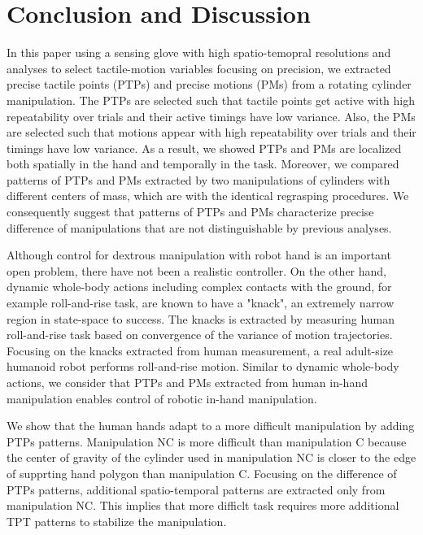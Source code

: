 \documentclass[letterpaper, 10 pt, conference]{IEEEtran}  %
\begin{document}
\section{Conclusion and Discussion}
In this paper using a sensing glove with high spatio-temopral resolutions and analyses to select tactile-motion variables focusing on precision, we extracted precise tactile points (PTPs) and precise motions (PMs) from a rotating cylinder manipulation. The PTPs are selected such that tactile points get active with high repeatability over trials and their active timings have low variance. Also, the PMs are selected such that motions appear with high repeatability over trials and their timings have low variance. As a result, we showed PTPs and PMs are localized both spatially in the hand and temporally in the task. Moreover, we compared patterns of PTPs and PMs extracted by two manipulations of cylinders with different centers of mass, which are with the identical regrasping procedures. We consequently suggest that patterns of PTPs and PMs characterize precise difference of manipulations that are not distinguishable by previous analyses.

Although control for dextrous manipulation with robot hand is an important open problem\cite{bicchi2000hands}, there have not been a realistic controller. On the other hand, dynamic whole-body actions including complex contacts with the ground, for example roll-and-rise task, are known to have a "knack", an extremely narrow region in state-space to success\cite{kuniyoshi2007emergence}. The knacks is extracted by measuring human roll-and-rise task based on convergence of the variance of motion trajectories. Focusing on the knacks extracted from human measurement, a real adult-size humanoid robot performs roll-and-rise motion\cite{kuniyoshi2004dynamic}. Similar to dynamic whole-body actions, we consider that PTPs and PMs extracted from human in-hand manipulation enables control of robotic in-hand manipulation.

We show that the human hands adapt to a more difficult manipulation by adding PTPs patterns. Manipulation NC is more difficult than manipulation C because the center of gravity of the cylinder used in manipulation NC is closer to the edge of supprting hand polygon than manipulation C. Focusing on the difference of PTPs patterns, additional spatio-temporal patterns are extracted only from manipulation NC. This implies that more difficlt task requires more additional TPT patterns to stabilize the manipulation.
\end{document}
